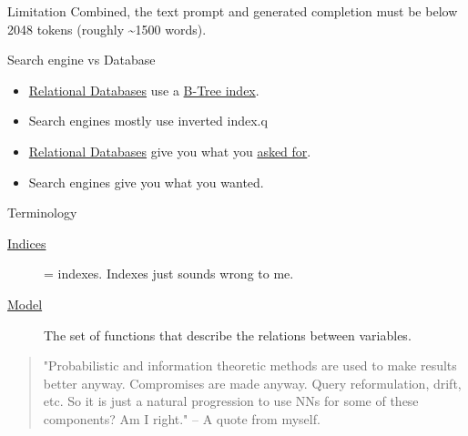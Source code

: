 \documentclass[presentation]{beamer}
\begin{document}
\begin{frame}[label={sec:org7448e54}]{Limitation}
Combined, the text prompt and generated
completion must be below 2048 tokens (roughly
\textasciitilde{}1500 words).
\end{frame}

\begin{frame}[label={sec:org36a9117}]{Search engine vs Database}
\begin{itemize}
\item \uline{Relational Databases} use a \uline{B-Tree index}.
\item \alert{Search engines} mostly use \alert{inverted index}.q
\item \uline{Relational Databases} give you what you \uline{asked for}.
\item \alert{Search engines} give you what you \alert{wanted}.
\end{itemize}
\end{frame}

\begin{frame}[label={sec:org914b2c6}]{Terminology}
\begin{description}
\item[{\uline{Indices}}] = indexes. Indexes just sounds wrong to me.
\item[{\uline{Model}}] The \alert{set of functions} that describe the relations between variables.
\end{description}

\begin{quote}
"Probabilistic and information theoretic methods are used to make results better anyway.
Compromises are made anyway. Query reformulation, drift, etc.
So it is just a natural progression to use NNs for some of these components? Am I right." -- A quote from myself.
\end{quote}
\end{frame}
\end{document}
